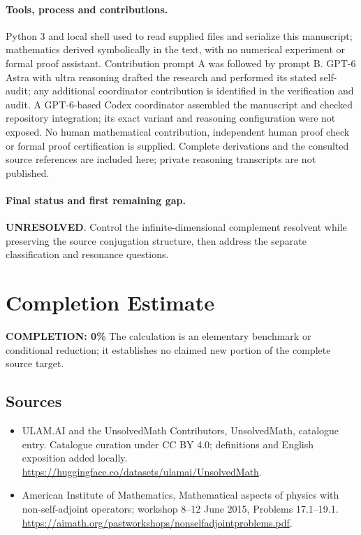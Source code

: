 \documentclass[11pt]{article}
\begin{document}
\paragraph{Tools, process and contributions.}
Python 3 and local shell used to read supplied files and serialize this manuscript; mathematics derived symbolically in the text, with no numerical experiment or formal proof assistant. Contribution prompt A was followed by prompt B. GPT-6 Astra with ultra reasoning drafted the research and performed its stated self-audit; any additional coordinator contribution is identified in the verification and audit. A GPT-6-based Codex coordinator assembled the manuscript and checked repository integration; its exact variant and reasoning configuration were not exposed. No human mathematical contribution, independent human proof check or formal proof certification is supplied. Complete derivations and the consulted source references are included here; private reasoning transcripts are not published.

\paragraph{Final status and first remaining gap.}
\textbf{UNRESOLVED}. Control the infinite-dimensional complement resolvent while preserving the source conjugation structure, then address the separate classification and resonance questions.

\section{Completion Estimate}
\noindent\textbf{COMPLETION: 0\%}
The calculation is an elementary benchmark or conditional reduction; it establishes no claimed new portion of the complete source target.

\subsection{Sources}
\begin{itemize}
\item[\hypertarget{source:statement:1}{S1}] ULAM.AI and the UnsolvedMath Contributors, UnsolvedMath, catalogue entry. Catalogue curation under CC BY 4.0; definitions and English exposition added locally.
\url{https://huggingface.co/datasets/ulamai/UnsolvedMath}.
\item[\hypertarget{source:statement:2}{S2}] American Institute of Mathematics, Mathematical aspects of physics with non-self-adjoint operators; workshop 8–12 June 2015, Problems 17.1–19.1.
\url{https://aimath.org/pastworkshops/nonselfadjointproblems.pdf}.
\end{itemize}
\label{end:statement}
\end{document}
